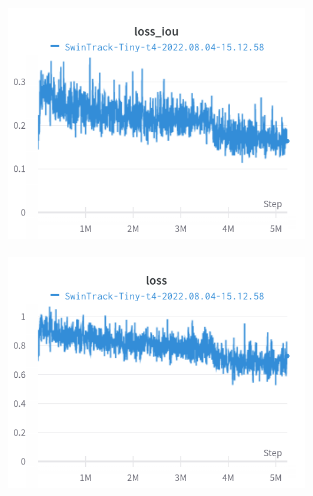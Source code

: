 \begin{figure}[H]
	\centerline{\includegraphics[width=0.7\textwidth]{charts/Section-2-Panel-13-ffs6mrffa}}
	\caption{
	}
	\label{chart:loss_iou1}
\end{figure}

\begin{figure}[H]
	\centerline{\includegraphics[width=0.7\textwidth]{charts/Section-2-Panel-11-jg4qpu2ty}}
	\caption{
	}
	\label{chart:loss1}
\end{figure}
